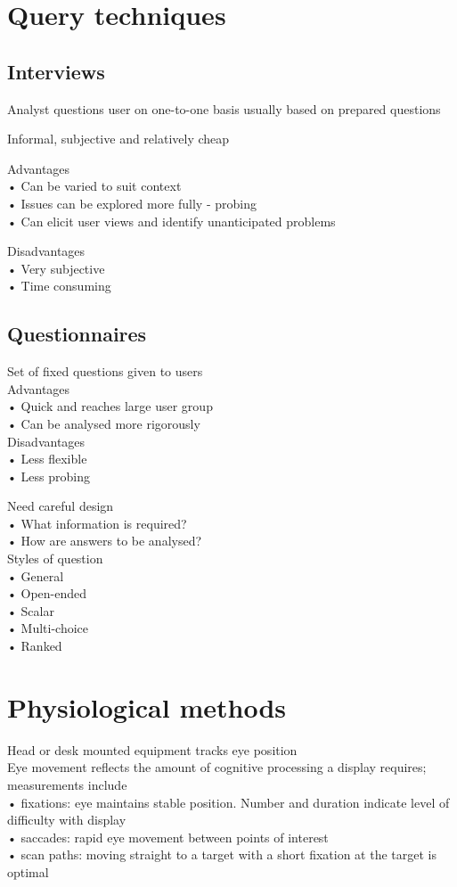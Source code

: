 \documentclass[]{project_plan}
\begin{document}
\section{Query techniques}

\subsection{Interviews}

Analyst questions user on one-to-one basis
usually based on prepared questions

Informal, subjective and relatively cheap

Advantages\\
• Can be varied to suit context\\
• Issues can be explored more fully - probing\\
• Can elicit user views and identify unanticipated
problems

Disadvantages\\
• Very subjective\\
• Time consuming

\subsection{Questionnaires}
Set of fixed questions given to users\\
Advantages\\
• Quick and reaches large user group\\
• Can be analysed more rigorously\\
Disadvantages\\
• Less flexible\\
• Less probing

Need careful design\\
• What information is required?\\
• How are answers to be analysed?\\
Styles of question\\
• General\\
• Open-ended\\
• Scalar\\
• Multi-choice\\
• Ranked

\section{Physiological methods}
Head or desk mounted equipment tracks eye position\\
Eye movement reflects the amount of cognitive processing a display requires;\\
measurements include\\
• fixations: eye maintains stable position. Number and duration indicate level of difficulty with display\\
• saccades: rapid eye movement between points of interest\\
• scan paths: moving straight to a target with a short fixation at the target is optimal
\end{document}
